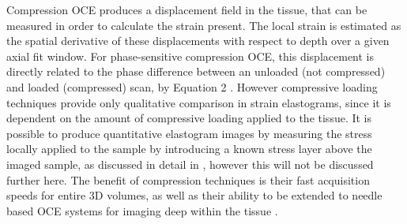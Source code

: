 Compression OCE produces a displacement field in the tissue, that can be measured in order to calculate the strain present. The local strain is estimated as the spatial derivative of these displacements with respect to depth \cite{kennedy_review_2014} over a given axial fit window. For phase-sensitive compression OCE, this displacement is directly related to the phase difference between an unloaded (not compressed) and loaded (compressed) scan, by Equation 2 \cite{kennedy_strain_2012}. However compressive loading techniques provide only qualitative comparison in strain elastograms, since it is dependent on the amount of compressive loading applied to the tissue. It is possible to produce quantitative elastogram images by measuring the stress locally applied to the sample by introducing a known stress layer above the imaged sample, as discussed in detail in \cite{kennedy_quantitative_2015}, however this will not be discussed further here. The benefit of compression techniques is their fast acquisition speeds for entire 3D volumes, as well as their ability to be extended to needle based OCE systems for imaging deep within the tissue \cite{kennedy_review_2014}. 

